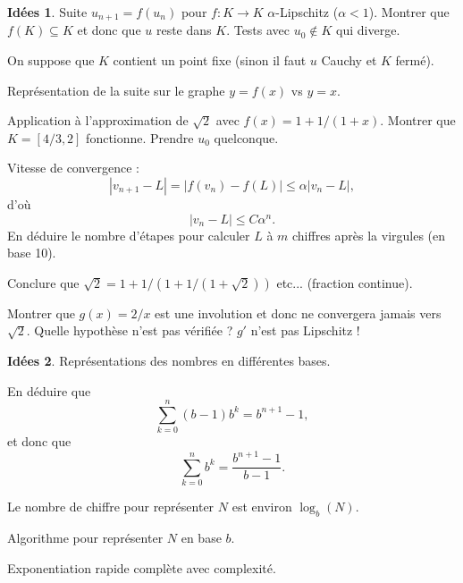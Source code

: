 \documentclass[a4paper,12pt, notitlepage]{article}
\theoremstyle{definition}
\newtheorem{idee}{Idées}
\begin{document}
\begin{idee}
	Suite $u_{n+1} = f(u_n)$ pour $f : K \rightarrow K$ $\alpha$-Lipschitz ($\alpha < 1$).
	Montrer que $f(K) \subseteq K$ et donc que $u$ reste dans $K$.
	Tests avec $u_0 \not\in K$ qui diverge.
	
	On suppose que $K$ contient un point fixe (sinon il faut $u$ Cauchy et $K$ fermé).
	
	Représentation de la suite sur le graphe $y=f(x)$ vs $y=x$.
	
	Application à l'approximation de $\sqrt{2}$ avec $f(x) =1 + 1/(1+x)$.
	Montrer que $K=[4/3,2]$ fonctionne. Prendre $u_0$ quelconque.
	
	Vitesse de convergence :
		\[ |v_{n+1} - L| = |f(v_n) - f(L)| \leq \alpha |v_n - L|, \]
	d'où
		\[ |v_n - L| \leq C \alpha^n. \]
	En déduire le nombre d'étapes pour calculer $L$ à $m$ chiffres après la virgules (en base 10).
	
	Conclure que $\sqrt{2} = 1 + 1/(1+1/(1+\sqrt{2}))$ etc... (fraction continue).
	
	
	Montrer que $g(x) = 2/x$ est une involution et donc ne convergera jamais vers $\sqrt{2}$. 
	Quelle hypothèse n'est pas vérifiée ? $g'$ n'est pas Lipschitz !
\end{idee}

\begin{idee}
	Représentations des nombres en différentes bases.
	
	En déduire que 
		\[ \sum_{k=0}^{n} (b-1)b^k = b^{n+1} - 1, \]
	et donc que 
		\[ \sum_{k=0}^n b^k = \dfrac{b^{n+1} - 1}{b-1}. \]
	
	Le nombre de chiffre pour représenter $N$ est environ $\log_b(N)$. 
	
	Algorithme pour représenter $N$ en base $b$.
	
	Exponentiation rapide complète avec complexité.
\end{idee}
\end{document}
